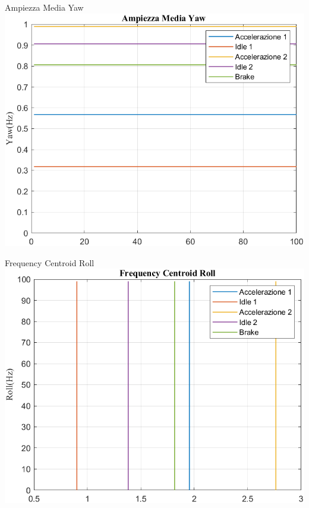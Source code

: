 \documentclass[beamer]{standalone}
\begin{document}
	\begin{frame}{{Ampiezza Media Yaw}}
		\centering\includegraphics[height=.8\textheight]{figure/VAng/Trasformata/Ampiezza MediaYaw}
	\end{frame}
	
	\begin{frame}{{Frequency Centroid Roll}}
		\centering\includegraphics[height=.8\textheight]{figure/VAng/Trasformata/Frequency CentroidRoll}
	\end{frame}
	
\end{document}
